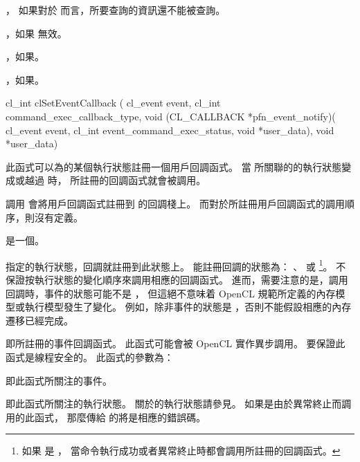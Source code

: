 \item {}，
如果對於  而言，所要查詢的資訊還不能被查詢。

\item {}，如果  無效。

\item {}，如果\scdevfailres。

\item {}，如果\schostfailres。
\stopigBase


\startCLFUNC
cl_int clSetEventCallback (
	cl_event event,
	cl_int command_exec_callback_type,
	void (CL_CALLBACK *pfn_event_notify)(
		cl_event event,
		cl_int event_command_exec_status,
		void *user_data),
	void *user_data)
\stopCLFUNC

此函式可以為的某個執行狀態註冊一個用戶回調函式。
當  所關聯的的執行狀態變成或越過  時，
所註冊的回調函式就會被調用。

調用  會將用戶回調函式註冊到  的回調棧上。
而對於所註冊用戶回調函式的調用順序，則沒有定義。

 是一個。

 指定的執行狀態，回調就註冊到此狀態上。
能註冊回調的狀態為：
、  或 
\footnote{如果  是 ，
當命令執行成功或者異常終止時都會調用所註冊的回調函式。}。
不保證按執行狀態的變化順序來調用相應的回調函式。
進而，需要注意的是，調用回調時，事件的狀態可能不是 ，
但這絕不意味着 OpenCL 規範所定義的內存模型或執行模型發生了變化。
例如，除非事件的狀態是 ，否則不能假設相應的內存遷移已經完成。

 即所註冊的事件回調函式。
此函式可能會被 OpenCL 實作異步調用。
要保證此函式是線程安全的。
此函式的參數為：
\startigBase
\item {} 即此函式所關注的事件。

\item {} 即此函式所關注的執行狀態。
關於的執行狀態請參見。
如果是由於異常終止而調用的此函式，
那麼傳給  的將是相應的錯誤碼。

